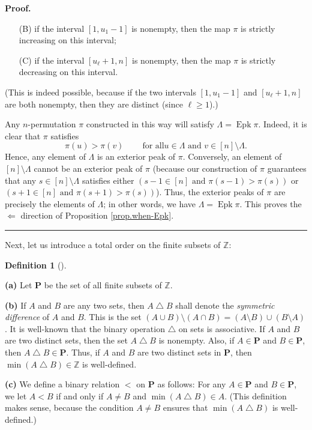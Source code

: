 \documentclass[numbers=enddot,12pt,final,onecolumn,notitlepage]{scrartcl}%
\theoremstyle{definition}
\newtheorem{defi}[theo]{Definition}
\newenvironment{definition}[1][]
{\begin{defi}[#1]\begin{leftbar}}
{\end{leftbar}\end{defi}}
\newenvironment{proof}[1][Proof]{\noindent\textbf{#1.} }{\ \rule{0.5em}{0.5em}}
\newenvironment{verlong}{}{}
\begin{document}
\begin{verlong}
\begin{proof}
\begin{itemize}
\begin{itemize}
\item[(B)] if the interval $\left[  1,u_{1}-1\right]  $ is nonempty, then the
map $\pi$ is strictly increasing on this interval;

\item[(C)] if the interval $\left[  u_{\ell}+1,n\right]  $ is nonempty, then
the map $\pi$ is strictly decreasing on this interval.
\end{itemize}

(This is indeed possible, because if the two intervals $\left[  1,u_{1}%
-1\right]  $ and $\left[  u_{\ell}+1,n\right]  $ are both nonempty, then they
are distinct (since $\ell\geq1$).)
\end{itemize}

Any $n$-permutation $\pi$ constructed in this way will satisfy $\Lambda
=\operatorname*{Epk}\pi$. Indeed, it is clear that $\pi$ satisfies%
\[
\pi\left(  u\right)  >\pi\left(  v\right)  \ \ \ \ \ \ \ \ \ \ \text{for all
}u\in\Lambda\text{ and }v\in\left[  n\right]  \setminus\Lambda.
\]
Hence, any element of $\Lambda$ is an exterior peak of $\pi$. Conversely, an
element of $\left[  n\right]  \setminus\Lambda$ cannot be an exterior peak of
$\pi$ (because our construction of $\pi$ guarantees that any $s\in\left[
n\right]  \setminus\Lambda$ satisfies either $\left(  s-1\in\left[  n\right]
\text{ and }\pi\left(  s-1\right)  >\pi\left(  s\right)  \right)  $ or
$\left(  s+1\in\left[  n\right]  \text{ and }\pi\left(  s+1\right)
>\pi\left(  s\right)  \right)  $). Thus, the exterior peaks of $\pi$ are
precisely the elements of $\Lambda$; in other words, we have $\Lambda
=\operatorname*{Epk}\pi$. This proves the $\Longleftarrow$ direction of
Proposition \ref{prop.when-Epk}.
\end{proof}
\end{verlong}

Next, let us introduce a total order on the finite subsets of $\mathbb{Z}$:

\begin{definition}
\textbf{(a)} Let $\mathbf{P}$ be the set of all finite subsets of $\mathbb{Z}$.

\textbf{(b)} If $A$ and $B$ are any two sets, then $A\bigtriangleup B$ shall
denote the \textit{symmetric difference} of $A$ and $B$. This is the set
$\left(  A\cup B\right)  \setminus\left(  A\cap B\right)  =\left(  A\setminus
B\right)  \cup\left(  B\setminus A\right)  $. It is well-known that the binary
operation $\bigtriangleup$ on sets is associative. If $A$ and $B$ are two
distinct sets, then the set $A\bigtriangleup B$ is nonempty. Also, if
$A\in\mathbf{P}$ and $B\in\mathbf{P}$, then $A\bigtriangleup B\in\mathbf{P}$.
Thus, if $A$ and $B$ are two distinct sets in $\mathbf{P}$, then $\min\left(
A\bigtriangleup B\right)  \in\mathbb{Z}$ is well-defined.

\textbf{(c)} We define a binary relation $<$ on $\mathbf{P}$ as follows: For
any $A\in\mathbf{P}$ and $B\in\mathbf{P}$, we let $A<B$ if and only if $A\neq
B$ and $\min\left(  A\bigtriangleup B\right)  \in A$. (This definition makes
sense, because the condition $A\neq B$ ensures that $\min\left(
A\bigtriangleup B\right)  $ is well-defined.)
\end{definition}
\end{document}

